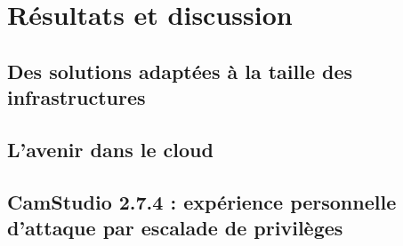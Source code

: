 \section{Résultats et discussion}
\label{sec:resultats}

\subsection{Des solutions adaptées à la taille des infrastructures}
\label{subsec:soltaille}


\subsection{L'avenir dans le cloud}
\label{subsec:avenircloud}

\subsection{CamStudio 2.7.4 : expérience personnelle d'attaque par escalade de privilèges}
\label{subsec:camstudio}